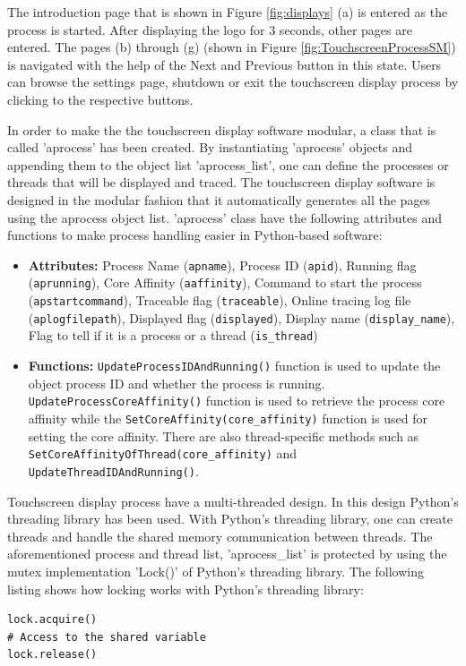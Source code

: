The introduction page that is shown in Figure \ref{fig:displays} (a) is entered as the process is started. After displaying the logo for 3 seconds, other pages are entered. The pages (b) through (g) (shown in Figure \ref{fig:TouchscreenProcessSM}) is navigated with the help of the Next and Previous button in this state. Users can browse the settings page, shutdown or exit the touchscreen display process by clicking to the respective buttons.

In order to make the the touchscreen display software modular, a class that is called 'aprocess' has been created. By instantiating 'aprocess' objects and appending them to the object list 'aprocess\texttt{\_}list', one can define the processes or threads that will be displayed and traced. The touchscreen display software is designed in the modular fashion that it automatically generates all the pages using the aprocess object list. 'aprocess' class have the following attributes and functions to make process handling easier in Python-based software:

\begin{itemize}
	\item \textbf{Attributes:} Process Name (\texttt{apname}), Process ID (\texttt{apid}), Running flag (\texttt{aprunning}), Core Affinity (\texttt{aaffinity}), Command to start the process (\texttt{apstartcommand}), Traceable flag (\texttt{traceable}), Online tracing log file (\texttt{aplogfilepath}), Displayed flag (\texttt{displayed}), Display name (\texttt{display\_name}), Flag to tell if it is a process or a thread (\texttt{is\_thread})
	\item \textbf{Functions:} \texttt{UpdateProcessIDAndRunning()} function is used to update the object process ID and whether the process is running. \texttt{UpdateProcessCoreAffinity()} function is used to retrieve the process core affinity while the  \texttt{SetCoreAffinity(core\_affinity)} function is used for setting the core affinity. There are also thread-specific methods such as \texttt{SetCoreAffinityOfThread(core\_affinity)} and \texttt{UpdateThreadIDAndRunning()}.
\end{itemize}

Touchscreen display process have a multi-threaded design. In this design Python's threading library \cite{pythonthreading} has been used. With Python's threading library, one can create threads and handle the shared memory communication between threads. The aforementioned process and thread list, 'aprocess{\_}list' is protected by using the mutex implementation 'Lock()' \cite{pythonthreading} of Python's threading library. The following listing shows how locking works with Python's threading library:
\begin{lstlisting}[style=python]
lock.acquire()
# Access to the shared variable
lock.release()
\end{lstlisting}

